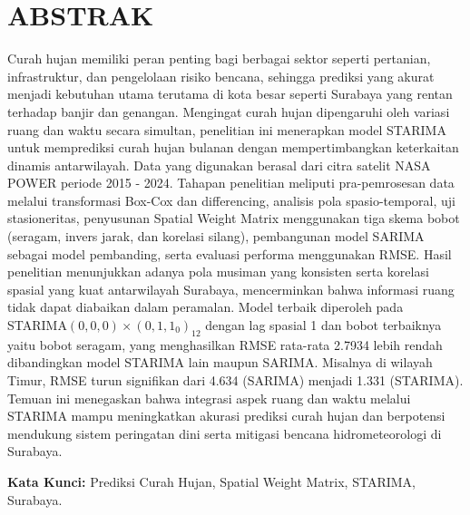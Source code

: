 \chapter*{ABSTRAK}
Curah hujan memiliki peran penting bagi berbagai sektor seperti pertanian, infrastruktur, dan pengelolaan risiko bencana, sehingga prediksi yang akurat menjadi kebutuhan utama terutama di kota besar seperti Surabaya yang rentan terhadap banjir dan genangan.
Mengingat curah hujan dipengaruhi oleh variasi ruang dan waktu secara simultan, penelitian ini menerapkan model STARIMA untuk memprediksi curah hujan bulanan dengan mempertimbangkan keterkaitan dinamis antarwilayah.
Data yang digunakan berasal dari citra satelit NASA POWER periode 2015 - 2024.
Tahapan penelitian meliputi pra-pemrosesan data melalui transformasi Box-Cox dan differencing, analisis pola spasio-temporal, uji stasioneritas, penyusunan Spatial Weight Matrix menggunakan tiga skema bobot (seragam, invers jarak, dan korelasi silang), pembangunan model SARIMA sebagai model pembanding, serta evaluasi performa menggunakan RMSE.
Hasil penelitian menunjukkan adanya pola musiman yang konsisten serta korelasi spasial yang kuat antarwilayah Surabaya, mencerminkan bahwa informasi ruang tidak dapat diabaikan dalam peramalan.
Model terbaik diperoleh pada STARIMA$(0, 0, 0) \times (0, 1, 1_{0})_{12}$ dengan lag spasial 1 dan bobot terbaiknya yaitu bobot seragam, yang menghasilkan RMSE rata-rata 2.7934 lebih rendah dibandingkan model STARIMA lain maupun SARIMA.
Misalnya di wilayah Timur, RMSE turun signifikan dari 4.634 (SARIMA) menjadi 1.331 (STARIMA).
Temuan ini menegaskan bahwa integrasi aspek ruang dan waktu melalui STARIMA mampu meningkatkan akurasi prediksi curah hujan dan berpotensi mendukung sistem peringatan dini serta mitigasi bencana hidrometeorologi di Surabaya.
\vspace{0.5 cm}
\begin{flushleft}
{\textbf{Kata Kunci:} Prediksi Curah Hujan, Spatial Weight Matrix, STARIMA, Surabaya.}
\end{flushleft}